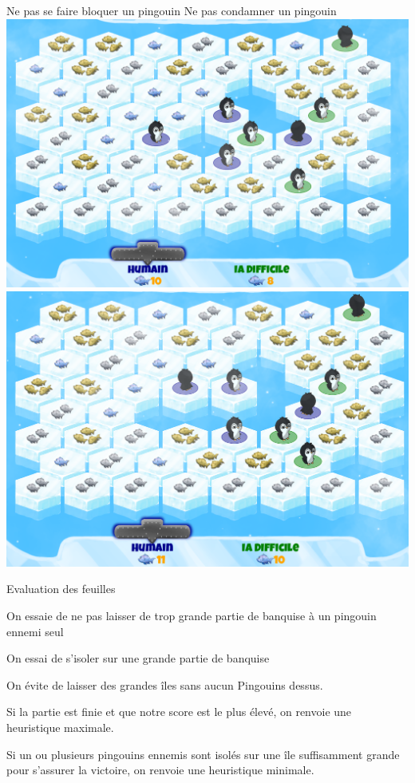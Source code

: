 \documentclass{beamer}
\begin{document}
\begin{frame}{}
\begin{block}{}
\begin{center}
 Ne pas se faire bloquer un pingouin \newline
 Ne pas condamner un pingouin
 \includegraphics[scale=0.09]{IA7}
 \includegraphics[scale=0.09]{IA8}
\end{center}
\end{block}
\end{frame}

\begin{frame}{}
\begin{block}{Evaluation des feuilles}
\begin{center}
 \item<1-> On essaie de ne pas laisser de trop grande partie de banquise à un pingouin ennemi seul
 \item<2-> On essai de s'isoler sur une grande partie de banquise
 \item<3-> On évite de laisser des grandes îles sans aucun Pingouins dessus.
 \item<4-> Si la partie est finie et que notre score est le plus élevé, on renvoie 
une heuristique maximale.
 \item<5-> Si un ou plusieurs pingouins ennemis sont isolés sur une île suffisamment grande pour s'assurer la victoire, on renvoie une heuristique minimale.
\end{center}
\end{block}
\end{frame}
\end{document}

